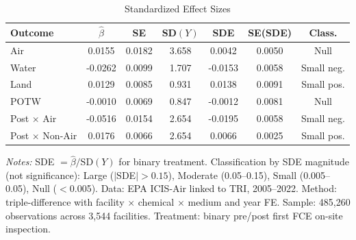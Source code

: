 \begin{table}[t]
\centering
\caption{Standardized Effect Sizes}
\label{tab:sde}
\small
\begin{tabular}{lcccccc}
\hline\hline
Outcome & $\hat{\beta}$ & SE & SD$(Y)$ & SDE & SE(SDE) & Class. \\
\hline
Air & 0.0155 & 0.0182 & 3.658 & 0.0042 & 0.0050 & Null
\\
Water & -0.0262 & 0.0099 & 1.707 & -0.0153 & 0.0058 & Small neg.
\\
Land & 0.0129 & 0.0085 & 0.931 & 0.0138 & 0.0091 & Small pos.
\\
POTW & -0.0010 & 0.0069 & 0.847 & -0.0012 & 0.0081 & Null
\\
Post $\times$ Air & -0.0516 & 0.0154 & 2.654 & -0.0195 & 0.0058 & Small neg.
\\
Post $\times$ Non-Air & 0.0176 & 0.0066 & 2.654 & 0.0066 & 0.0025 & Small pos.
\\
\hline\hline
\end{tabular}
\vspace{0.3em}
\begin{minipage}{\textwidth}
\footnotesize
\textit{Notes:} SDE $= \hat{\beta} / \text{SD}(Y)$ for binary treatment. Classification by SDE magnitude (not significance): Large ($|$SDE$| > 0.15$), Moderate (0.05--0.15), Small (0.005--0.05), Null ($<$0.005). Data: EPA ICIS-Air linked to TRI, 2005--2022. Method: triple-difference with facility $\times$ chemical $\times$ medium and year FE. Sample: 485,260 observations across 3,544 facilities. Treatment: binary pre/post first FCE on-site inspection.
\end{minipage}
\end{table}
